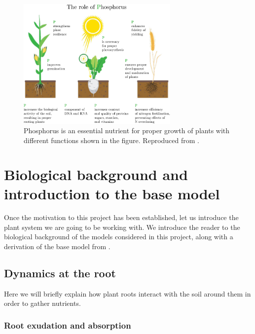 \documentclass[11pt]{article}
\numberwithin{equation}{section}
\begin{document}
\begin{figure}[!htb]
     \centering
     \includegraphics[width=0.7\textwidth]{Figures/PhosphorusPlantRoles.pdf}
     \caption{Phosphorus is an essential nutrient for proper growth of plants with  different functions shown in the figure. Reproduced from \cite{fertilizers}.}
     \label{fig:Phos}
 \end{figure}
\section{Biological background and introduction to the base model}
\label{sec:Bio-background}

Once the motivation to this project has been established, let us introduce the plant system we are going to be working with. We introduce the reader to the biological background of the models considered in this project, along with a derivation of the base model from \cite{Ptashnyk-2011}.

\subsection{Dynamics at the root}
Here we will briefly explain how plant roots interact with the soil around them in order to gather nutrients.

\subsubsection{Root exudation and absorption}
\end{document}
